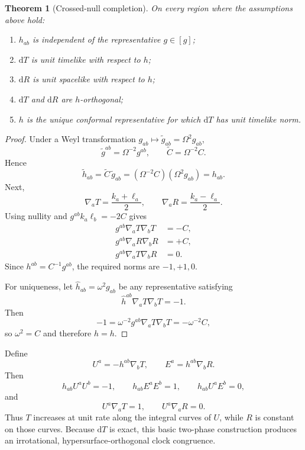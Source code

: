 \documentclass[11pt,a4paper]{article}
\newtheorem{theorem}[definition]{Theorem}
\newcommand{\dd}{\mathrm{d}}
\newcommand{\Ccross}{C}
\begin{document}
\begin{theorem}[Crossed-null completion]
On every region where the assumptions above hold:
\begin{enumerate}
  \item $h_{ab}$ is independent of the representative $g\in[g]$;
  \item $\dd T$ is unit timelike with respect to $h$;
  \item $\dd R$ is unit spacelike with respect to $h$;
  \item $\dd T$ and $\dd R$ are $h$-orthogonal;
  \item $h$ is the unique conformal representative for which $\dd T$ has unit timelike norm.
\end{enumerate}
\end{theorem}

\begin{proof}
Under a Weyl transformation $g_{ab}\mapsto\widetilde g_{ab}=\Omega^2g_{ab}$,
\[
\widetilde g^{ab}=\Omega^{-2}g^{ab},
\qquad
\widetilde{\Ccross}=\Omega^{-2}\Ccross.
\]
Hence
\[
\widetilde h_{ab}=\widetilde{\Ccross}\,\widetilde g_{ab}
=(\Omega^{-2}\Ccross)(\Omega^2g_{ab})=h_{ab}.
\]
Next,
\[
\nabla_aT=\frac{k_a+\ell_a}{2},
\qquad
\nabla_aR=\frac{k_a-\ell_a}{2}.
\]
Using nullity and $g^{ab}k_a\ell_b=-2\Ccross$ gives
\begin{align}
 g^{ab}\nabla_aT\nabla_bT&=-\Ccross,\\
 g^{ab}\nabla_aR\nabla_bR&=+\Ccross,\\
 g^{ab}\nabla_aT\nabla_bR&=0.
\end{align}
Since $h^{ab}=\Ccross^{-1}g^{ab}$, the required norms are $-1,+1,0$.

For uniqueness, let $\widehat h_{ab}=\omega^2g_{ab}$ be any representative satisfying
\[
\widehat h^{ab}\nabla_aT\nabla_bT=-1.
\]
Then
\[
-1=\omega^{-2}g^{ab}\nabla_aT\nabla_bT
=-\omega^{-2}\Ccross,
\]
so $\omega^2=\Ccross$ and therefore $\widehat h=h$.
\end{proof}

Define
\begin{equation}
U^a=-h^{ab}\nabla_bT,
\qquad
E^a=h^{ab}\nabla_bR.
\label{eq:UE}
\end{equation}
Then
\[
h_{ab}U^aU^b=-1,
\qquad
h_{ab}E^aE^b=1,
\qquad
h_{ab}U^aE^b=0,
\]
and
\[
U^a\nabla_aT=1,
\qquad
U^a\nabla_aR=0.
\]
Thus $T$ increases at unit rate along the integral curves of $U$, while $R$ is constant on those curves. Because $\dd T$ is exact, this basic two-phase construction produces an irrotational, hypersurface-orthogonal clock congruence.
\end{document}
